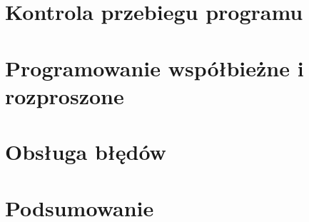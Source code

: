 \section{Kontrola przebiegu programu}
\label{sec:erlangFlow}




\section{Programowanie współbieżne i rozproszone}
\label{sec:erlangConcurrent}

\section{Obsługa błędów}
\label{sec:erlangBledy}

\section{Podsumowanie}
\label{sec:erlangPodsumowanie}